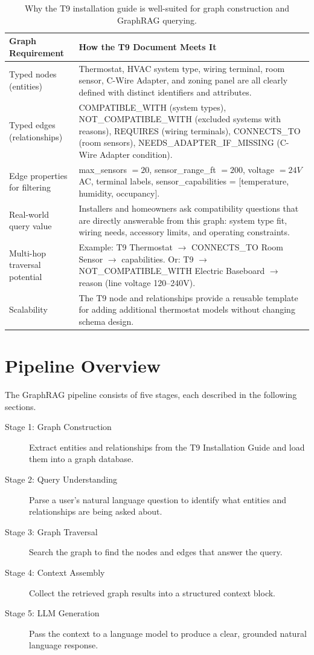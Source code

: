 \documentclass[11pt,a4paper]{article}
\begin{document}
\begin{table}[H]
\centering
\small
\setlength{\tabcolsep}{6pt}
\begin{tabularx}{\textwidth}{L{0.30\textwidth}Y}
\toprule
{}
\textbf{Graph Requirement} & \textbf{How the T9 Document Meets It} \\
\midrule
Typed nodes (entities) & Thermostat, HVAC system type, wiring terminal, room sensor, C-Wire Adapter, and zoning panel are all clearly defined with distinct identifiers and attributes. \\
Typed edges (relationships) & COMPATIBLE\_WITH (system types), NOT\_COMPATIBLE\_WITH (excluded systems with reasons), REQUIRES (wiring terminals), CONNECTS\_TO (room sensors), NEEDS\_ADAPTER\_IF\_MISSING (C-Wire Adapter condition). \\
Edge properties for filtering & max\_sensors $=20$, sensor\_range\_ft $=200$, voltage $=24V$ AC, terminal labels, sensor\_capabilities = [temperature, humidity, occupancy]. \\
Real-world query value & Installers and homeowners ask compatibility questions that are directly answerable from this graph: system type fit, wiring needs, accessory limits, and operating constraints. \\
Multi-hop traversal potential & Example: T9 Thermostat $\rightarrow$ CONNECTS\_TO Room Sensor $\rightarrow$ capabilities. Or: T9 $\rightarrow$ NOT\_COMPATIBLE\_WITH Electric Baseboard $\rightarrow$ reason (line voltage 120--240V). \\
Scalability & The T9 node and relationships provide a reusable template for adding additional thermostat models without changing schema design. \\
\bottomrule
\end{tabularx}
\caption{Why the T9 installation guide is well-suited for graph construction and GraphRAG querying.}
\label{tab:graph-fit}
\end{table}

\section{Pipeline Overview}
The GraphRAG pipeline consists of five stages, each described in the following sections.

\begin{description}
    \item[Stage 1: Graph Construction] Extract entities and relationships from the T9 Installation Guide and load them into a graph database.
    \item[Stage 2: Query Understanding] Parse a user's natural language question to identify what entities and relationships are being asked about.
    \item[Stage 3: Graph Traversal] Search the graph to find the nodes and edges that answer the query.
    \item[Stage 4: Context Assembly] Collect the retrieved graph results into a structured context block.
    \item[Stage 5: LLM Generation] Pass the context to a language model to produce a clear, grounded natural language response.
\end{description}
\end{document}
